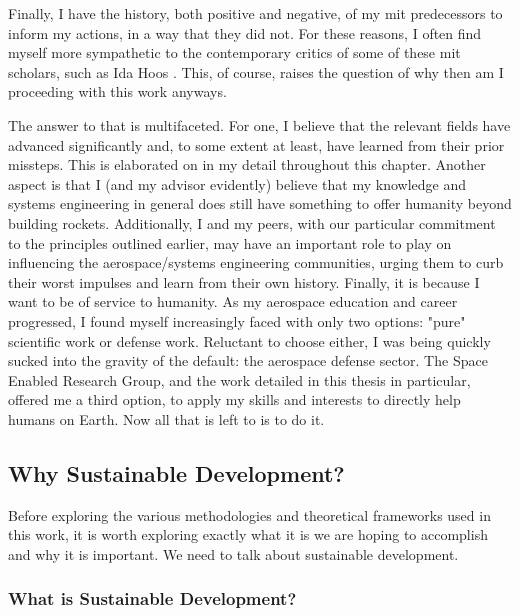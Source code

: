 Finally, I have the history, both positive and negative, of my \ac{mit} predecessors to inform my actions, in a way that they did not. For these reasons, I often find myself more sympathetic to the contemporary critics of some of these \ac{mit} scholars, such as Ida Hoos \cite{hoosSystemsAnalysisPublic1983}. This, of course, raises the question of why then am I proceeding with this work anyways.	

The answer to that is multifaceted. For one, I believe that the relevant fields have advanced significantly and, to some extent at least, have learned from their prior missteps. This is elaborated on in my detail throughout this chapter. Another aspect is that I (and my advisor evidently) believe that my knowledge and systems engineering in general does still have something to offer humanity beyond building rockets. Additionally, I and my peers, with our particular commitment to the principles outlined earlier, may have an important role to play on influencing the aerospace/systems engineering communities, urging them to curb their worst impulses and learn from their own history. Finally, it is because I want to be of service to humanity. As my aerospace education and career progressed, I found myself increasingly faced with only two options: "pure" scientific work or defense work. Reluctant to choose either, I was being quickly sucked into the gravity of the default: the aerospace defense sector. The Space Enabled Research Group, and the work detailed in this thesis in particular, offered me a third option, to apply my skills and interests to directly help humans on Earth. Now all that is left to is to do it.

\subsection{Why Sustainable Development?} \label{sec:sustainable_development}

Before exploring the various methodologies and theoretical frameworks used in this work, it is worth exploring exactly what it is we are hoping to accomplish and why it is important. We need to talk about sustainable development.
 
\subsubsection{What is Sustainable Development?} \label{sec:sustain}

